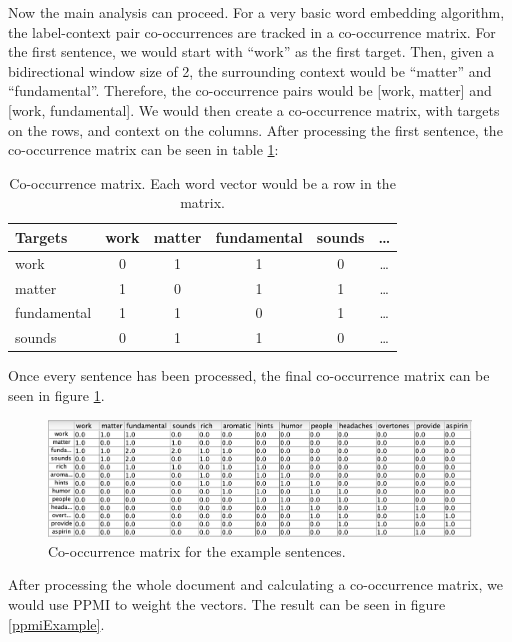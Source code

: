 Now the main analysis can proceed. For a very basic word embedding algorithm, the label-context pair co-occurrences are tracked in a co-occurrence matrix. For the first sentence, we would start with ``work'' as the first target. Then, given a bidirectional window size of 2, the surrounding context would be ``matter'' and ``fundamental''. Therefore, the co-occurrence pairs would be [work, matter] and [work, fundamental]. We would then create a co-occurrence matrix, with targets on the rows, and context on the columns.  After processing the first sentence, the co-occurrence matrix can be seen in table \ref{exampleCoocmat}:

\begin{table}[h]
    \centering
    \begin{tabular}{|l|c|c|c|c|c|}
    \hline
    Targets & work & matter & fundamental & sounds & \dots \\
    \hline
    work & 0 & 1 & 1 & 0 & \dots \\
    \hline
    matter & 1 & 0 & 1 & 1 & \dots \\
    \hline
    fundamental & 1 & 1 & 0 & 1 & \dots \\
    \hline
    sounds & 0 & 1 & 1 & 0 & \dots \\
    \hline
    \end{tabular}
    \caption{Co-occurrence matrix. Each word vector would be a row in the matrix.}
    \label{exampleCoocmat}
\end{table}

Once every sentence has been processed, the final co-occurrence matrix can be seen in figure \ref{coocExample}.

\begin{figure}[h]
    \centering
    \includegraphics[scale=.5]{./images/full_cooc_matrix.png}
    \caption[Generated using SimBrain.]{Co-occurrence matrix for the example sentences.}
 \label{coocExample}
\end{figure}

After processing the whole document and calculating a co-occurrence matrix, we would use PPMI to weight the vectors. The result can be seen in figure \ref{ppmiExample}.

